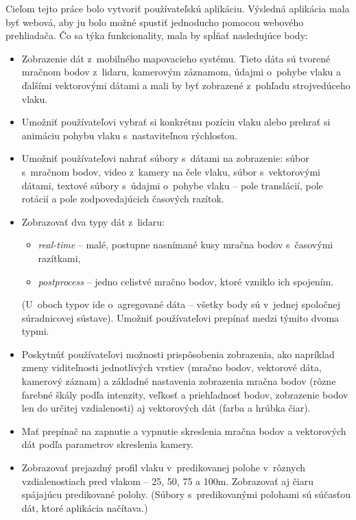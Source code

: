Cieľom tejto práce bolo vytvoriť používateľskú aplikáciu. Výsledná aplikácia mala byť webová, aby ju bolo možné spustiť jednoducho pomocou webového prehliadača. Čo sa týka funkcionality, mala by spĺňať nasledujúce body:

\begin{itemize}
    \item Zobrazenie dát z~mobilného mapovacieho systému. Tieto dáta sú tvorené mračnom bodov z~lidaru, kamerovým záznamom, údajmi o~pohybe vlaku a ďalšími vektorovými dátami a mali by byť zobrazené z~pohľadu strojvedúceho vlaku.
    \item Umožniť používateľovi vybrať si konkrétnu pozíciu vlaku alebo prehrať si animáciu pohybu vlaku s~nastaviteľnou rýchlosťou.
    \item Umožniť používateľovi nahrať súbory s~dátami na zobrazenie: súbor s~mračnom bodov, video z~kamery na čele vlaku, súbor s~vektorovými dátami, textové súbory s~údajmi o~pohybe vlaku -- pole translácií, pole rotácií a pole zodpovedajúcich časových razítok.
    \item Zobrazovať dva typy dát z~lidaru:
    \begin{itemize}
        \item \emph{real-time} -- malé, postupne nasnímané kusy mračna bodov s~časovými razítkami,
        \item \emph{postprocess} -- jedno celistvé mračno bodov, ktoré vzniklo ich spojením.
    \end{itemize}
    (U~oboch typov ide o~agregované dáta -- všetky body sú v~jednej spoločnej súradnicovej sústave). Umožniť používateľovi prepínať medzi týmito dvoma typmi.
    \item Poskytnúť používateľovi možnosti prispôsobenia zobrazenia, ako napríklad zmeny viditeľnosti jednotlivých vrstiev (mračno bodov, vektorové dáta, kamerový záznam) a základné nastavenia zobrazenia mračna bodov (rôzne farebné škály podľa intenzity, veľkosť a priehľadnosť bodov, zobrazenie bodov len do určitej vzdialenosti) aj vektorových dát (farba a hrúbka čiar).
    \item Mať prepínač na zapnutie a vypnutie skreslenia mračna bodov a vektorových dát podľa parametrov skreslenia kamery.
    \item Zobrazovať prejazdný profil vlaku v~predikovanej polohe v~rôznych vzdialenostiach pred vlakom -- 25, 50, 75 a 100m. Zobrazovať aj čiaru spájajúcu predikované polohy. (Súbory s~predikovanými polohami sú súčasťou dát, ktoré aplikácia načítava.)

\end{itemize}

